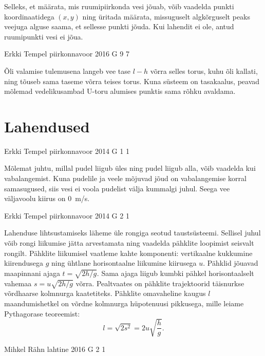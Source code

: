 \documentclass[11pt]{article}
\begin{document}
{{\ifHint
Selleks, et määrata, mis ruumipiirkonda vesi jõuab, võib vaadelda punkti koordinaatidega $(x, y)$ ning üritada määrata, missuguselt algkõrguselt peaks veejuga alguse saama, et sellesse punkti jõuda. Kui lahendit ei ole, antud ruumipunkti vesi ei jõua.
\fi
}

{Erkki Tempel} %
{piirkonnavoor} %
{2016} %
{G 9} %
{7} %
{

\ifHint
Õli valamise tulemusena langeb vee tase $l - h$ võrra selles torus, kuhu õli kallati, ning tõuseb sama taseme võrra teises torus. Kuna süsteem on tasakaalus, peavad mõlemad vedelikusambad U-toru alumises punktis sama rõhku avaldama.
\fi
}
\newpage\section{Lahendused}
        \ToggleSolution
        
{Erkki Tempel} %
{piirkonnavoor} %
{2014} %
{G 1} %
{1} %
{

\ifSolution
Mõlemat juhtu, millal pudel liigub üles ning pudel liigub alla, võib vaadelda kui vabalangemist. Kuna pudelile ja veele mõjuvad jõud on vabalangemise korral samasugused, siis vesi ei voola pudelist välja kummalgi juhul. Seega vee väljavoolu kiirus on \SI{0}{m/s}.
\fi
}

{Erkki Tempel} %
{piirkonnavoor} %
{2014} %
{G 2} %
{1} %
{

\ifSolution
Lahenduse lihtsustamiseks läheme üle rongiga seotud taustsüsteemi. Sellisel juhul võib rongi liikumise jätta arvestamata ning vaadelda pähklite loopimist seisvalt rongilt. Pähklite liikumisel vaatleme kahte komponenti: vertikaalne kukkumine kiirendusega $g$ ning ühtlane horisontaalne liikumine kiirusega $u$. Pähklid jõuavad maapinnani ajaga 
$t=\sqrt{2h/g}$.
Sama ajaga liigub kumbki pähkel horisontaalselt vahemaa $s=u\sqrt{2h/g}$ võrra. Pealtvaates on pähklite trajektoorid täisnurkse võrdhaarse kolmnurga kaatetiteks. Pähklite omavaheline kaugus $l$ maandumishetkel on võrdne kolmnurga hüpotenuusi pikkusega, mille leiame Pythagorase teoreemist:
\[ l=\sqrt{2s^2}=2u\sqrt{\frac{h}{g}}. \]
\fi
}

{Mihkel Rähn} %
{lahtine} %
{2016} %
{G 2} %
{1} %
{

}}
\end{document}
